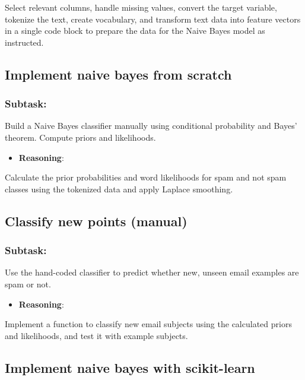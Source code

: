 \documentclass[12pt,a4paper]{article}
\begin{document}
Select relevant columns, handle missing values, convert the target variable, tokenize the text, create vocabulary, and transform text data into feature vectors in a single code block to prepare the data for the Naive Bayes model as instructed.



\subsection{Implement naive bayes from scratch}

\subsubsection{Subtask:}
Build a Naive Bayes classifier manually using conditional probability and Bayes' theorem. Compute priors and likelihoods.


\begin{itemize}
    \item \textbf{Reasoning}:
\end{itemize}

Calculate the prior probabilities and word likelihoods for spam and not spam classes using the tokenized data and apply Laplace smoothing.



\subsection{Classify new points (manual)}

\subsubsection{Subtask:}
Use the hand-coded classifier to predict whether new, unseen email examples are spam or not.


\begin{itemize}
    \item \textbf{Reasoning}:
\end{itemize}

Implement a function to classify new email subjects using the calculated priors and likelihoods, and test it with example subjects.



\subsection{Implement naive bayes with scikit-learn}
\end{document}
